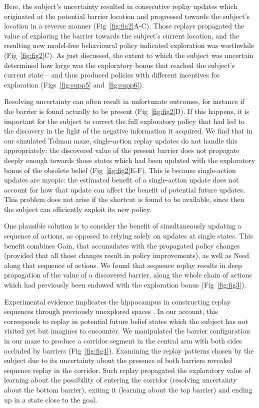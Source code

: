 Here, the subject's uncertainty resulted in consecutive replay updates which originated at the potential barrier location and progressed towards the subject's location in a reverse manner (Fig~\ref{fig:fig2}A-C). Those replays propagated the value of exploring the barrier towards the subject's current location, and the resulting new model-free behavioural policy indicated exploration was worthwhile (Fig~\ref{fig:fig2}C). As just discussed, the extent to which the subject was uncertain determined how large was the exploratory bonus that reached the subject's current state -- and thus produced policies with different incentives for exploration (Figs~\ref{fig:supp5} and~\ref{fig:supp6}). 

Resolving uncertainty can often result in unfortunate outcomes, for instance if the barrier is found actually to be present (Fig~\ref{fig:fig2}D). If this happens, it is important for the subject to  correct the full exploratory policy that had led to the discovery in the light of the negative information it acquired. We find that in our simulated Tolman maze, single-action replay updates do not handle this appropriately: the discovered value of the present barrier does not propagate deeply enough towards those states which had been updated with the exploratory bonus of the obsolete belief (Fig~\ref{fig:fig2}E-F). This is because  single-action updates are myopic: the estimated benefit of a single-action update does not account for how that update can affect the benefit of potential future updates. This problem does not arise if the shortcut is found to be available, since then the subject can efficiently exploit its new policy.

One plausible solution is to consider the benefit of simultaneously updating a sequence of actions, as opposed to  relying solely on updates at single states. This benefit combines Gain, that accumulates with the propagated policy changes (provided that all those changes result in policy improvements), as well as Need along that sequence of actions. We found that sequence replay results in deep propagation of the value of a discovered barrier, along the whole chain of actions which had previously been endowed with the exploration bonus (Fig~\ref{fig:fig3}).

Experimental evidence implicates the hippocampus in constructing replay sequences through previously unexplored spaces \parencite{guptaHippocampalReplayNot2010, olafsdottirHippocampalPlaceCells2015}. In our account, this corresponds to replay in potential future belief states which the subject has not visited yet but imagines to encounter. We manipulated the barrier configuration in our maze to produce a corridor segment in the central arm with both sides occluded by barriers (Fig~\ref{fig:fig4}). Examining the replay patterns chosen by the subject due to its uncertainty about the presence of both barriers revealed sequence replay in the corridor. Such replay propagated the exploratory value of learning about the possibility of entering the corridor (resolving uncertainty about the bottom barrier), exiting it (learning about the top barrier) and ending up in a state close to the goal.

